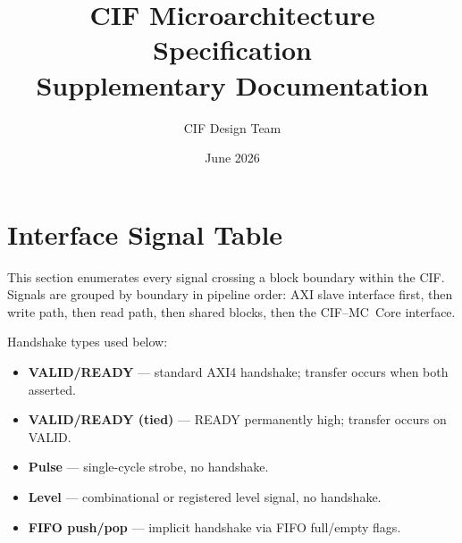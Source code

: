 \documentclass[11pt,a4paper]{article}
\title{\textbf{CIF Microarchitecture Specification}\\
\large Supplementary Documentation}
\author{CIF Design Team}
\date{June 2026}
\begin{document}
\maketitle
\tableofcontents
\newpage

\section{Interface Signal Table}

This section enumerates every signal crossing a block boundary within the CIF.
Signals are grouped by boundary in pipeline order: AXI slave interface first,
then write path, then read path, then shared blocks, then the CIF--MC~Core
interface.

Handshake types used below:
\begin{itemize}
  \item \textbf{VALID/READY} --- standard AXI4 handshake; transfer occurs when both asserted.
  \item \textbf{VALID/READY (tied)} --- READY permanently high; transfer occurs on VALID.
  \item \textbf{Pulse} --- single-cycle strobe, no handshake.
  \item \textbf{Level} --- combinational or registered level signal, no handshake.
  \item \textbf{FIFO push/pop} --- implicit handshake via FIFO full/empty flags.
\end{itemize}

\end{document}
